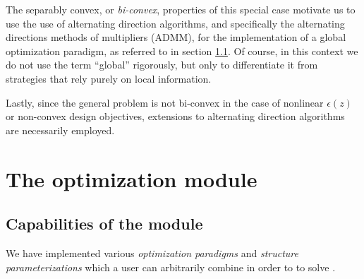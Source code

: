 \documentclass{book}
\begin{document}
The separably convex, or \emph{bi-convex}, properties of this special case
    motivate us to use the use of alternating direction algorithms,
    and specifically the alternating directions 
    methods of multipliers (ADMM), %
    for the implementation of a global optimization paradigm,
    as referred to in section \ref{capabilities of our software}.
Of course, in this context we do not use the term ``global'' rigorously,
    but only to differentiate it from strategies that rely
    purely on local information.

Lastly, since the general problem is not bi-convex 
    in the case of nonlinear $\epsilon(z)$ or non-convex design objectives,
    extensions to alternating direction algorithms are necessarily employed.



\chapter{The optimization module}

\section{Capabilities of the module}\label{capabilities of our software}
We have implemented various 
    \emph{optimization paradigms} and \emph{structure parameterizations}
    which a user can arbitrarily combine in order to 
    to solve .
\end{document}
